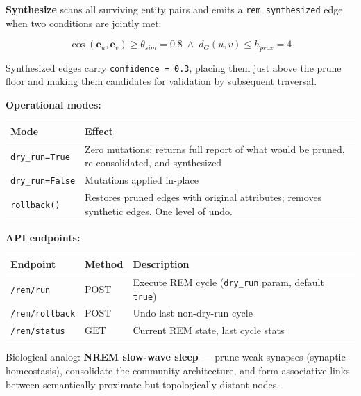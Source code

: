 \documentclass[10pt,journal,compsoc]{IEEEtran}
\begin{document}
\textbf{Synthesize} scans all surviving entity pairs and emits a \texttt{rem\_synthesized} edge when two conditions are jointly met:

\begin{equation}
\cos(\mathbf{e}_u, \mathbf{e}_v) \geq \theta_{sim} = 0.8 \;\wedge\; d_G(u, v) \leq h_{prox} = 4
\end{equation}

Synthesized edges carry \texttt{confidence = 0.3}, placing them just above the prune floor and making them candidates for validation by subsequent traversal.

\textbf{Operational modes:}

\begin{center}
\begin{tabularx}{\columnwidth}{|>{\raggedright\arraybackslash}X|>{\raggedright\arraybackslash}X|}
\hline
Mode & Effect \\ \hline
\texttt{dry\_run=True} & Zero mutations; returns full report of what would be pruned, re-conso\-lidated, and synthesized \\ \hline
\texttt{dry\_run=False} & Mutations applied in-place \\ \hline
\texttt{rollback()} & Restores pruned edges with original attributes; removes synthetic edges. One level of undo. \\ \hline
\end{tabularx}
\end{center}

\textbf{API endpoints:}

\begin{center}
{\footnotesize
\begin{tabularx}{\columnwidth}{|>{\raggedright\arraybackslash}X|>{\raggedright\arraybackslash}X|>{\raggedright\arraybackslash}X|}
\hline
Endpoint & Method & Description \\ \hline
\texttt{/rem/run} & POST & Execute REM cycle (\texttt{dry\_run} param, default \texttt{true}) \\ \hline
\texttt{/rem/rollback} & POST & Undo last non-dry-run cycle \\ \hline
\texttt{/rem/status} & GET & Current REM state, last cycle stats \\ \hline
\end{tabularx}
}
\end{center}

Biological analog: \textbf{NREM slow-wave sleep} — prune weak synapses (synaptic homeostasis), consolidate the community archi\-tecture, and form associative links between seman\-tically proximate but topol\-ogically distant nodes.
\end{document}
